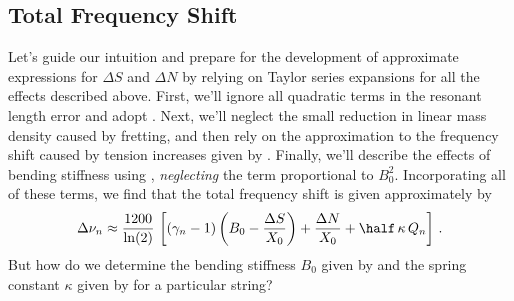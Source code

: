 \subsection{Total Frequency Shift\label{sct:tot_freq_shift}}

Let's guide our intuition and prepare for the development of approximate expressions for $\Delta S$ and $\Delta N$ by relying on Taylor series expansions for all the effects described above. First, we'll ignore all quadratic terms in the resonant length error and adopt . Next, we'll neglect the small reduction in linear mass density caused by fretting, and then rely on the approximation to the frequency shift caused by tension increases given by . Finally, we'll describe the effects of bending stiffness using , \emph{neglecting} the term proportional to $B_0^2$. Incorporating all of these terms, we find that the total frequency shift is given approximately by
\begin{equation}\label{eqn:error_tot}
  \Delta \nu_n \approx \frac{1200}{\ln(2)}\, \left[ \left(\gamma_n - 1\right) \left(B_0 - \frac{\Delta S}{X_0}\right) + \frac{\Delta N}{X_0} + \half\, \kappa\, Q_n \right]\, .
\end{equation}
But how do we determine the bending stiffness $B_0$ given by  and the spring constant $\kappa$ given by  for a particular string?




